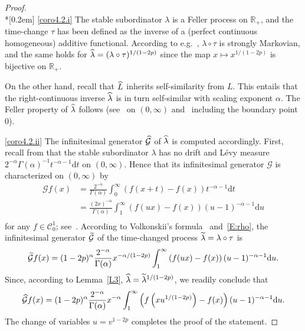 \documentclass[10pt]{amsart}
\theoremstyle{definition}\newtheorem{defi}[theo]{Definition}\newtheorem{rema}[theo]{Remark}\newtheorem{exam}[theo]{Example}\newtheorem{exem}[theo]{Example}\newtheorem{nota}[theo]{Notation}
\renewcommand{\tilde}[1]{\widetilde{#1}}
\renewcommand{\hat}[1]{\widehat{#1}}
\newcommand{\dd}{\mathrm{d}}
\newcommand{\R}{\mathbb{R}}
\newcommand{\calC}{\mathcal{C}}
\newcommand{\calG}{\mathcal{G}}
\let\oldtilde\tilde
\renewcommand*{\tilde}[1]{\mathchoice{\widetilde{#1}}{\widetilde{#1}}{\oldtilde{#1}}{\oldtilde{#1}}}
\let\oldhat\hat
\renewcommand*{\hat}[1]{\mathchoice{\widehat{#1}}{\widehat{#1}}{\oldhat{#1}}{\oldhat{#1}}}
\begin{document}
\begin{proof}\ \\*[0.2em]
\eqref{coro4.2.i} The stable subordinator $\lambda$ is a Feller process on $\R_+$, and the time-change $\tau$ has been defined as the inverse of a (perfect continuous homogeneous) additive functional. According to e.g.~\cite[Section~III.21]{WillRo}, $\lambda\circ \tau$ is strongly Markovian, and the same holds for $\hat \lambda=(\lambda\circ \tau)^{1/(1-2p)}$ since the map $x\mapsto x^{1/(1-2p)}$ is bijective on $\R_+$.

On the other hand, recall that $\hat{L}$ inherits self-similarity from ${L}$. This entails that the right-continuous inverse $\hat \lambda$ is in turn self-similar with scaling exponent $\alpha$. The Feller property of $\hat \lambda$ follows (see~\cite[Theorem~2.1]{Lamperti} on $(0,\infty)$ and~\cite[Theorem~1]{BY} including the boundary point $0$).


\noindent\eqref{coro4.2.ii} The infinitesimal generator $\hat{\calG}$ of $\hat \lambda$ is computed accordingly. First, recall from \cite[Proposition~3.2]{DRVY} that the stable subordinator $\lambda$ has no drift and Lévy measure $2^{-\alpha} \Gamma(\alpha)^{-1} t^{-\alpha - 1} \dd t $ on $(0,\infty)$. Hence that its infinitesimal generator ${\calG}$ is characterized on $(0,\infty)$ by
\begin{align*}
{\calG}f(x) &= \frac{2^{-\alpha}}{\Gamma(\alpha)}\int_0^{\infty} \left(f(x+t)-f(x)\right) t^{-\alpha - 1} \dd t \\
&= \frac{(2x)^{-\alpha}}{\Gamma(\alpha)}\int_1^{\infty} \left(f(ux)-f(x)\right) (u-1)^{-\alpha - 1} \dd u \\
\end{align*}
for any $f\in \calC^1_0$; see~\cite[Theorem~31.5 on page 208]{Sato}. According to Volkonskii's formula~\cite[III.21.4, p.~277]{WillRo} and~\eqref{E:rho}, the infinitesimal generator $\tilde {\calG}$ of the time-changed process $\tilde \lambda=\lambda \circ \tau$ is
\[
\tilde {\calG}f(x) = (1-2p)^{\alpha} \frac{2^{-\alpha}}{\Gamma(\alpha)} x^{-\alpha /(1-2p)} \int_1^{\infty} \left(f(ux)-f(x)\right) (u-1)^{-\alpha - 1} \dd u.
\]
Since, according to Lemma~\ref{L3}, $\hat \lambda =\tilde \lambda^{1/(1-2p)}$, we readily conclude that
\[
\hat{\calG}f(x) = (1-2p)^{\alpha} \frac{2^{-\alpha}}{\Gamma(\alpha)} x^{-\alpha} \int_1^{\infty} \left(f\left(x u^{1/(1-2p)}\right)-f(x)\right) (u-1)^{-\alpha - 1} \dd u.
\]
The change of variables $u=v^{1-2p}$ completes the proof of the statement.
\end{proof}
\end{document}
